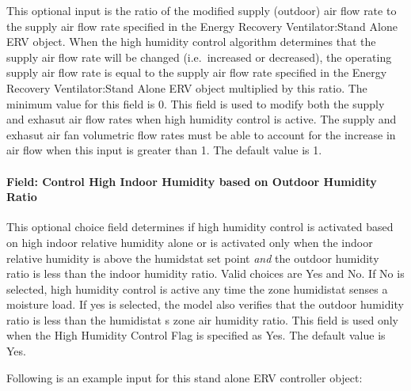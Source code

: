 This optional input is the ratio of the modified supply (outdoor) air flow rate to the supply air flow rate specified in the Energy Recovery Ventilator:Stand Alone ERV object. When the high humidity control algorithm determines that the supply air flow rate will be changed (i.e.~increased or decreased), the operating supply air flow rate is equal to the supply air flow rate specified in the Energy Recovery Ventilator:Stand Alone ERV object multiplied by this ratio. The minimum value for this field is 0. This field is used to modify both the supply and exhasut air flow rates when high humidity control is active. The supply and exhasut air fan volumetric flow rates must be able to account for the increase in air flow when this input is greater than 1. The default value is 1.

\paragraph{Field: Control High Indoor Humidity based on Outdoor Humidity Ratio}\label{field-control-high-indoor-humidity-based-on-outdoor-humidity-ratio-1}

This optional choice field determines if high humidity control is activated based on high indoor relative humidity alone or is activated only when the indoor relative humidity is above the humidstat set point \emph{and} the outdoor humidity ratio is less than the indoor humidity ratio. Valid choices are Yes and No. If No is selected, high humidity control is active any time the zone humidistat senses a moisture load. If yes is selected, the model also verifies that the outdoor humidity ratio is less than the humidistat s zone air humidity ratio. This field is used only when the High Humidity Control Flag is specified as Yes. The default value is Yes.

Following is an example input for this stand alone ERV controller object:

